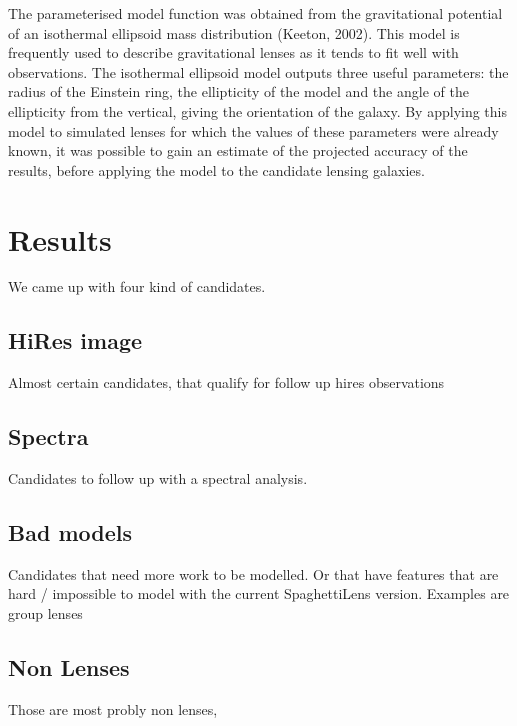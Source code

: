 \documentclass[a4paper,fleqn,usenatbib]{mnras}
\begin{document}
The parameterised model function was obtained from the gravitational potential of an isothermal ellipsoid mass distribution (Keeton, 2002).
This model is frequently used to describe gravitational lenses as it tends to fit well with observations.
The isothermal ellipsoid model outputs three useful parameters: the radius of the Einstein ring, the ellipticity of the model and the angle of the ellipticity from the vertical, giving the orientation of the galaxy.
By applying this model to simulated lenses for which the values of these parameters were already known, it was possible to gain an estimate of the projected accuracy of the results, before applying the model to the candidate lensing galaxies.





\section{Results}
We came up with four kind of candidates.

\subsection{HiRes image}
Almost certain candidates, that qualify for follow up hires observations



\subsection{Spectra}
Candidates to follow up with a spectral analysis. 


\subsection{Bad models}
Candidates that need more work to be modelled.
Or that have features that are hard / impossible to model with the current SpaghettiLens version.
Examples are group lenses



\subsection{Non Lenses}
Those are most probly non lenses, 
\end{document}

